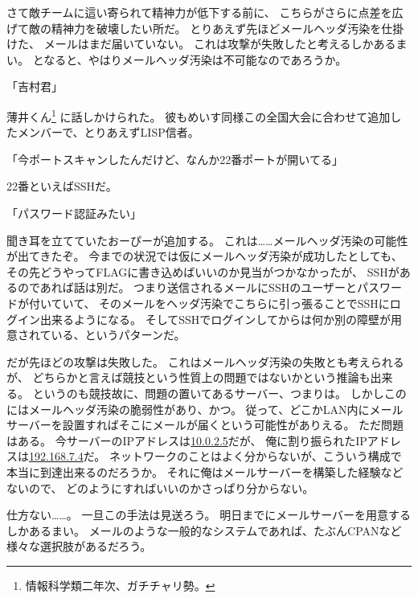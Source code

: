 さて敵チームに這い寄られて精神力が低下する前に、
こちらがさらに点差を広げて敵の精神力を破壊したい所だ。
とりあえず先ほどメールヘッダ汚染を仕掛けた、
メールはまだ届いていない。
これは攻撃が失敗したと考えるしかあるまい。
となると、やはりメールヘッダ汚染は不可能なのであろうか。

「吉村君」

薄井くん\footnote{情報科学類二年次、ガチチャリ勢。}%
に話しかけられた。
彼もめいす同様この全国大会に合わせて追加したメンバーで、とりあえずLISP信者。

「今ポートスキャンしたんだけど、なんか22番ポートが開いてる」

22番といえばSSHだ。

「パスワード認証みたい」

聞き耳を立てていたおーぴーが追加する。
これは……メールヘッダ汚染の可能性が出てきたぞ。
今までの状況では仮にメールヘッダ汚染が成功したとしても、
その先どうやってFLAGに書き込めばいいのか見当がつかなかったが、
SSHがあるのであれば話は別だ。
つまり送信されるメールにSSHのユーザーとパスワードが付いていて、
そのメールをヘッダ汚染でこちらに引っ張ることでSSHにログイン出来るようになる。
そしてSSHでログインしてからは何か別の障壁が用意されている、というパターンだ。

だが先ほどの攻撃は失敗した。
これはメールヘッダ汚染の失敗とも考えられるが、
どちらかと言えば競技という性質上の問題ではないかという推論も出来る。
というのも競技故に、問題の置いてあるサーバー、つまりは。
しかしこのにはメールヘッダ汚染の脆弱性があり、かつ。
従って、どこかLAN内にメールサーバーを設置すればそこにメールが届くという可能性がありえる。
ただ問題はある。
今サーバーのIPアドレスは\url{10.0.2.5}だが、
俺に割り振られたIPアドレスは\url{192.168.7.4}だ。
ネットワークのことはよく分からないが、こういう構成で本当に到達出来るのだろうか。
それに俺はメールサーバーを構築した経験などないので、
どのようにすればいいのかさっぱり分からない。

仕方ない……。
一旦この手法は見送ろう。
明日までにメールサーバーを用意するしかあるまい。
メールのような一般的なシステムであれば、たぶんCPANなど様々な選択肢があるだろう。

